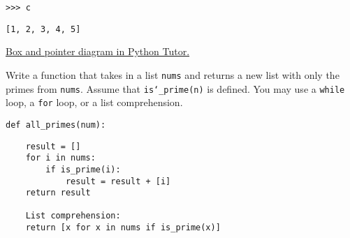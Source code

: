 \documentclass{exam}
\begin{document}
\begin{questions}
\begin{blocksection}
\begin{lstlisting}
>>> c
\end{lstlisting}
\begin{solution}[.25in]
\begin{lstlisting}
[1, 2, 3, 4, 5]
\end{lstlisting}
\end{solution}
\begin{solution}
\href{http://goo.gl/Gxe0qv}{Box and pointer diagram in Python Tutor.}
\end{solution}
\end{blocksection}


\begin{blocksection}
\question Write a function that takes in a list \texttt{nums} and returns a
new list with only the primes from \texttt{nums}. Assume that
\texttt{is\char`_prime(n)} is defined. You may use a \texttt{while} loop, a
\texttt{for} loop, or a list comprehension.

\begin{lstlisting}
def all_primes(num):
\end{lstlisting}
\begin{solution}[2in]
\begin{lstlisting}
    result = []
    for i in nums:
        if is_prime(i):
            result = result + [i]
    return result

    List comprehension:
    return [x for x in nums if is_prime(x)]
\end{lstlisting}
\end{solution}
\end{blocksection}
\end{questions}
\end{document}
